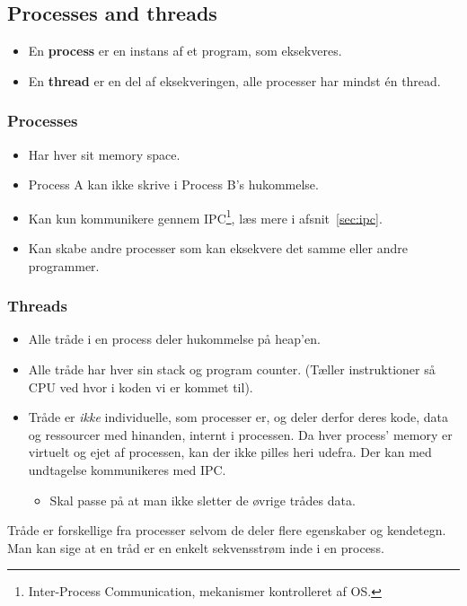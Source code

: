 \subsection{Processes and threads}
\begin{itemize}
	\item En \textbf{process} er en instans af et program, som eksekveres.
	\item En \textbf{thread} er en del af eksekveringen, alle processer har mindst én thread.
\end{itemize}

\subsubsection{Processes}
\begin{itemize}
	\item Har hver sit memory space.
	\item Process A kan ikke skrive i Process B's hukommelse.
	\item Kan kun kommunikere gennem IPC\footnote{Inter-Process Communication, mekanismer kontrolleret af OS.}, læs mere i afsnit~\ref{sec:ipc}.
	\item Kan skabe andre processer som kan eksekvere det samme eller andre programmer.
\end{itemize}

\subsubsection{Threads}
\begin{itemize}
	\item Alle tråde i en process deler hukommelse på heap'en.
	\item Alle tråde har hver sin stack og program counter. (Tæller instruktioner så CPU ved hvor i koden vi er kommet til).
	\item Tråde er \textit{ikke} individuelle, som processer er, og deler derfor deres kode, data og ressourcer med hinanden, internt i processen. Da hver process' memory er virtuelt og ejet af processen, kan der ikke pilles heri udefra. Der kan med undtagelse kommunikeres med IPC.
	\begin{itemize}
		\item Skal passe på at man ikke sletter de øvrige trådes data.
	\end{itemize}
\end{itemize}

Tråde er forskellige fra processer selvom de deler flere egenskaber og kendetegn. Man kan sige at en tråd er en enkelt sekvensstrøm inde i en process.\\


